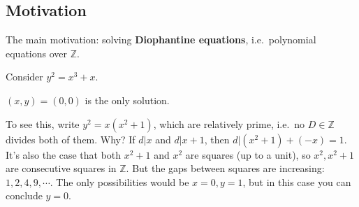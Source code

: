 \hypertarget{motivation}{%
\subsection{Motivation}\label{motivation}}

\begin{remark}

The main motivation: solving \textbf{Diophantine equations},
i.e.~polynomial equations over \({\mathbb{Z}}\).

\end{remark}

\begin{example}

Consider \(y^2 = x^3 + x\).

\begin{claim}

\((x, y) = (0, 0)\) is the only solution.

\end{claim}

To see this, write \(y^2 = x(x^2+1)\), which are relatively prime,
i.e.~no \(D\in {\mathbb{Z}}\) divides both of them. Why? If
\(d \mathrel{\Big|}x\) and \(d \mathrel{\Big|}x+1\), then
\(d\mathrel{\Big|}(x^2+1) + (-x) = 1\). It's also the case that both
\(x^2+1\) and \(x^2\) are squares (up to a unit), so \(x^2, x^2 + 1\)
are consecutive squares in \({\mathbb{Z}}\). But the gaps between
squares are increasing: \(1, 2, 4, 9, \cdots\). The only possibilities
would be \(x=0, y=1\), but in this case you can conclude \(y=0\).

\end{example}

